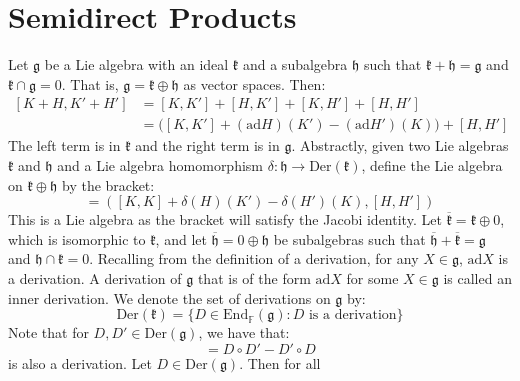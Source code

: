 \section{Semidirect Products}
    Let $\mathfrak{g}$ be a Lie algebra with an ideal $\mathfrak{k}$ and a
    subalgebra $\mathfrak{h}$ such that
    $\mathfrak{k}+\mathfrak{h}=\mathfrak{g}$ and
    $\mathfrak{k}\cap\mathfrak{g}=0$. That is,
    $\mathfrak{g}=\mathfrak{k}\oplus\mathfrak{h}$ as vector spaces. Then:
    \begin{subequations}
        \begin{align}
            [K+H,K'+H']&=[K,K']+[H,K']+[K,H']+[H,H']\\
            &=\Big([K,K']+(\textrm{ad}H)(K')-(\textrm{ad}H')(K)\Big)+[H,H']
        \end{align}
    \end{subequations}
    The left term is in $\mathfrak{k}$ and the right term is in
    $\mathfrak{g}$. Abstractly, given two Lie algebras $\mathfrak{k}$ and
    $\mathfrak{h}$ and a Lie algebra homomorphism
    $\delta:\mathfrak{h}\rightarrow\textrm{Der}(\mathfrak{k})$, define the
    Lie algebra on $\mathfrak{k}\oplus\mathfrak{h}$ by the bracket:
    \begin{equation}
        [(K,H),(K',H')]=
        ([K,K]+\delta(H)(K')-\delta(H')(K),[H,H'])
    \end{equation}
    This is a Lie algebra as the bracket will satisfy the Jacobi identity.
    Let $\overline{\mathfrak{k}}=\mathfrak{k}\oplus{0}$, which is isomorphic
    to $\mathfrak{k}$, and let $\overline{\mathfrak{h}}=0\oplus\mathfrak{h}$
    be subalgebras such that
    $\overline{\mathfrak{h}}+\overline{\mathfrak{k}}=\mathfrak{g}$ and
    $\mathfrak{h}\cap\mathfrak{k}=0$. Recalling from the definition of a
    derivation, for any $X\in\mathfrak{g}$, $\textrm{ad}X$ is a derivation.
    A derivation of $\mathfrak{g}$ that is of the form $\textrm{ad}X$ for
    some $X\in\mathfrak{g}$ is called an inner derivation. We denote the
    set of derivations on $\mathfrak{g}$ by:
    \begin{equation}
        \textrm{Der}(\mathfrak{k})=
        \{D\in\textrm{End}_{\mathbb{F}}(\mathfrak{g})
            :D\textrm{ is a derivation}\}
    \end{equation}
    Note that for $D,D'\in\textrm{Der}(\mathfrak{g})$, we have that:
    \begin{equation}
        [D,D']=D\circ{D}'-D'\circ{D}
    \end{equation}
    is also a derivation. Let $D\in\textrm{Der}(\mathfrak{g})$. Then for all
